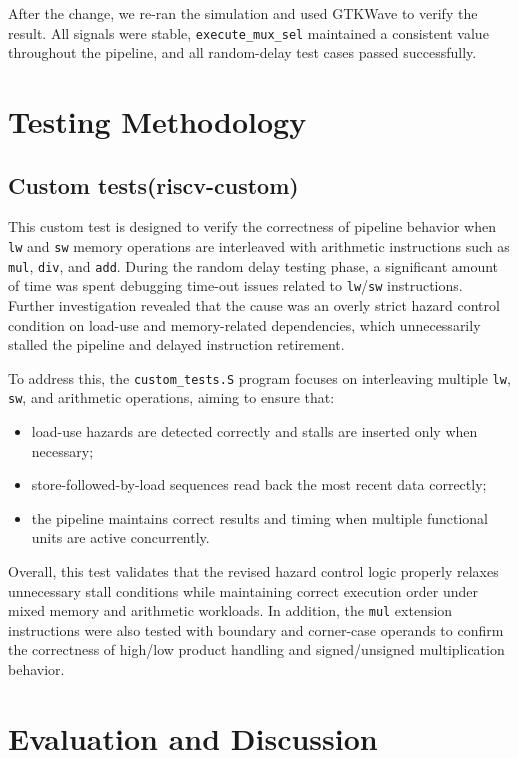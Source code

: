\documentclass[11pt,a4paper]{article}
\begin{document}
After the change, we re-ran the simulation and used GTKWave to verify the result. All signals were stable, \texttt{execute\_mux\_sel} maintained a consistent value throughout the pipeline, and all random-delay test cases passed successfully.

\section{Testing Methodology}
\subsection{Custom tests(riscv-custom)}
This custom test is designed to verify the correctness of pipeline behavior
when \texttt{lw} and \texttt{sw} memory operations are interleaved with arithmetic instructions
such as \texttt{mul}, \texttt{div}, and \texttt{add}.
During the random delay testing phase, a significant amount of time was spent
debugging time-out issues related to \texttt{lw}/\texttt{sw} instructions.
Further investigation revealed that the cause was an overly strict
hazard control condition on load-use and memory-related dependencies,
which unnecessarily stalled the pipeline and delayed instruction retirement.

To address this, the \texttt{custom\_tests.S} program focuses on
interleaving multiple \texttt{lw}, \texttt{sw}, and arithmetic operations,
aiming to ensure that:
\begin{itemize}
  \item load-use hazards are detected correctly and stalls are inserted only when necessary;
  \item store-followed-by-load sequences read back the most recent data correctly;
  \item the pipeline maintains correct results and timing when multiple functional units are active concurrently.
\end{itemize}


Overall, this test validates that the revised hazard control logic
properly relaxes unnecessary stall conditions while maintaining correct execution order
under mixed memory and arithmetic workloads.
In addition, the \texttt{mul} extension instructions were also tested
with boundary and corner-case operands to confirm
the correctness of high/low product handling and signed/unsigned multiplication behavior.


\section{Evaluation and Discussion}
\end{document}
